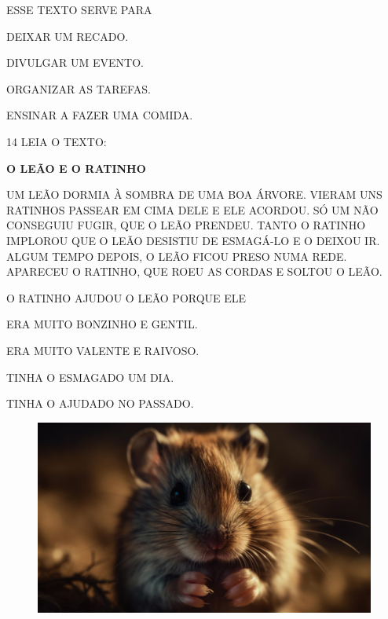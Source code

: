 ESSE TEXTO SERVE PARA

\begin{escolha}
\item DEIXAR UM RECADO.

\item DIVULGAR UM EVENTO.

\item ORGANIZAR AS TAREFAS.

\item ENSINAR A FAZER UMA COMIDA.
\end{escolha}

\pagebreak

\num{14} LEIA O TEXTO:

\begin{myquote}
\textbf{O LEÃO E O RATINHO}


UM LEÃO DORMIA À SOMBRA
DE UMA BOA ÁRVORE. VIERAM UNS RATINHOS PASSEAR EM CIMA DELE
E ELE ACORDOU. SÓ UM NÃO CONSEGUIU FUGIR, QUE O LEÃO
PRENDEU. TANTO O RATINHO IMPLOROU
QUE O LEÃO DESISTIU DE ESMAGÁ-LO E O DEIXOU IR.
ALGUM TEMPO DEPOIS, O LEÃO FICOU PRESO NUMA REDE. APARECEU O RATINHO,
QUE ROEU AS CORDAS E SOLTOU O LEÃO.

\end{myquote}

O RATINHO AJUDOU O LEÃO PORQUE ELE

\begin{escolha}
\item ERA MUITO BONZINHO E GENTIL.

\item ERA MUITO VALENTE E RAIVOSO.

\item TINHA O ESMAGADO UM DIA.

\item TINHA O AJUDADO NO PASSADO.
\end{escolha}

\begin{figure}[H]
\centering
\includegraphics[width=.9\textwidth]{media/image272.png}
\end{figure}

